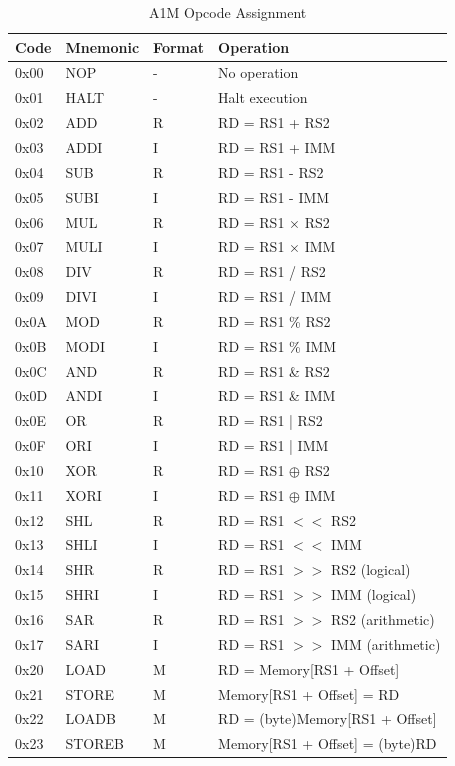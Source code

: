 \documentclass[12pt,a4paper,oneside]{book}
\begin{document}
\begin{table}[H]
\centering
\caption{A1M Opcode Assignment}
\label{tab:opcodes}
\small
\begin{tabularx}{\textwidth}{|l|l|l|X|}
\hline
\textbf{Code} & \textbf{Mnemonic} & \textbf{Format} & \textbf{Operation} \\
\hline
0x00 & NOP & - & No operation \\
0x01 & HALT & - & Halt execution \\
\hline
0x02 & ADD & R & RD = RS1 + RS2 \\
0x03 & ADDI & I & RD = RS1 + IMM \\
0x04 & SUB & R & RD = RS1 - RS2 \\
0x05 & SUBI & I & RD = RS1 - IMM \\
0x06 & MUL & R & RD = RS1 $\times$ RS2 \\
0x07 & MULI & I & RD = RS1 $\times$ IMM \\
0x08 & DIV & R & RD = RS1 / RS2 \\
0x09 & DIVI & I & RD = RS1 / IMM \\
0x0A & MOD & R & RD = RS1 \% RS2 \\
0x0B & MODI & I & RD = RS1 \% IMM \\
\hline
0x0C & AND & R & RD = RS1 \& RS2 \\
0x0D & ANDI & I & RD = RS1 \& IMM \\
0x0E & OR & R & RD = RS1 | RS2 \\
0x0F & ORI & I & RD = RS1 | IMM \\
0x10 & XOR & R & RD = RS1 $\oplus$ RS2 \\
0x11 & XORI & I & RD = RS1 $\oplus$ IMM \\
0x12 & SHL & R & RD = RS1 $<<$ RS2 \\
0x13 & SHLI & I & RD = RS1 $<<$ IMM \\
0x14 & SHR & R & RD = RS1 $>>$ RS2 (logical) \\
0x15 & SHRI & I & RD = RS1 $>>$ IMM (logical) \\
0x16 & SAR & R & RD = RS1 $>>$ RS2 (arithmetic) \\
0x17 & SARI & I & RD = RS1 $>>$ IMM (arithmetic) \\
\hline
0x20 & LOAD & M & RD = Memory[RS1 + Offset] \\
0x21 & STORE & M & Memory[RS1 + Offset] = RD \\
0x22 & LOADB & M & RD = (byte)Memory[RS1 + Offset] \\
0x23 & STOREB & M & Memory[RS1 + Offset] = (byte)RD \\

\end{tabularx}
\end{table}
\end{document}
